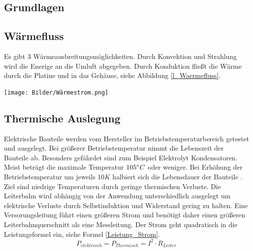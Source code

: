\documentclass[10pt,a4paper,oneside,abstracton]{scrartcl}
\newenvironment{Figure}
  {\par\medskip\noindent\minipage{\linewidth}}
  {\endminipage\par\medskip}
\begin{document}
\begin{multicols}{2}
\section{Grundlagen}

\subsection{Wärmefluss}
Es gibt 3 Wärmeausbreitungsmöglichkeiten.  
Durch Konvektion und Strahlung wird die Enerige an die Umluft abgegeben.
Durch Konduktion fließt die Wärme durch die Platine und in das Gehäuse, siehe Abbildung \ref*{l_Waermefluss}.

\begin{Figure}
	\texttt{[image: Bilder/Wärmestrom.png]}
	\label{l_Waermefluss}
\end{Figure}

\subsection{Thermische Auslegung}
Elektrische Bauteile werden vom Hersteller im Betriebstemperaturbereich getestet und ausgelegt. 
Bei größerer Betriebstemperatur nimmt die Lebenszeit der Bauteile ab. 
\newline
Besonders gefährdet sind zum Beispiel Elektrolyt Kondensatoren. 
Meist beträgt die maximale Temperatur $ 105 \degree C $ oder weniger. \newline 
Bei Erhöhung der Betriebstemperatur um jeweils $ 10K $ halbiert sich die Lebensdauer der Bauteile \cite{Elko}.
\newline
Ziel sind niedrige Temperaturen durch geringe thermischen Verluste. 
\newline
Die Leiterbahn wird abhängig von der Anwendung unterschiedlich ausgelegt um 
elektrische Verluste durch Selbstinduktion und Widerstand gering zu halten. 
\newline
Eine Versorungsleitung führt einen größeren Strom und benötigt daher einen größeren Leiterbahnquerschnitt als eine Messleitung.
Der Strom geht quadratisch in die Leistungsformel ein, siehe Formel \ref*{Leistung_Strom}. 
\begin{equation}
	P_{elektrisch} = P_{Thermisch} =  I^2 \cdot R_{Leiter} 
	\label{Leistung_Strom}
\end{equation}


\end{multicols}
\end{document}
